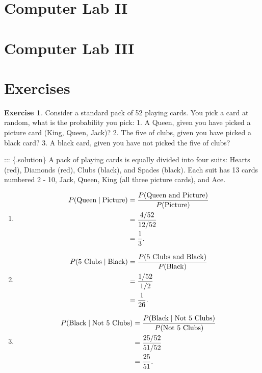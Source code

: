 \documentclass[
]{book}
\providecommand{\tightlist}{%
  \setlength{\itemsep}{0pt}\setlength{\parskip}{0pt}}
\theoremstyle{definition}
\theoremstyle{definition}
\theoremstyle{definition}
\newtheorem{exercise}{Exercise}[chapter]
\theoremstyle{definition}
\theoremstyle{remark}
\begin{document}
\hypertarget{computer-lab-ii}{%
\section{Computer Lab II}\label{computer-lab-ii}}

\hypertarget{computer-lab-iii}{%
\section{Computer Lab III}\label{computer-lab-iii}}

\hypertarget{exercises}{%
\section{Exercises}\label{exercises}}

\begin{exercise}
Consider a standard pack of 52 playing cards. You pick a card at random, what is the probability you pick:
1. A Queen, given you have picked a picture card (King, Queen, Jack)?
2. The five of clubs, given you have picked a black card?
3. A black card, given you have not picked the five of clubs?
\end{exercise}

::: \{.solution\}
A pack of playing cards is equally divided into four suits: Hearts (red), Diamonds (red), Clubs (black), and Spades (black). Each suit has 13 cards numbered 2 - 10, Jack, Queen, King (all three picture cards), and Ace.

\begin{enumerate}
\def\labelenumi{\arabic{enumi}.}
\tightlist
\item
  \begin{align*}
  P(\hbox{Queen} \mid \hbox{Picture}) &= \frac{P(\hbox{Queen and Picture})}{P(\hbox{Picture)}} \\
  & = \frac{4/52}{12/52} \\
  & = \frac{1}{3}.
  \end{align*}
\item
  \begin{align*}
  P(\hbox{5 Clubs} \mid \hbox{Black}) &= \frac{P(\hbox{5 Clubs and Black})}{P(\hbox{Black)}} \\
  & = \frac{1/52}{1/2} \\
  & = \frac{1}{26}.
  \end{align*}
\item
  \begin{align*}
  P(\hbox{Black} \mid \hbox{Not 5 Clubs}) & = \frac{P(\hbox{Black} \mid \hbox{Not 5 Clubs})}{P(\hbox{Not 5 Clubs})} \\
  & = \frac{25/52}{51/52}\\
  &= \frac{25}{51}.
  \end{align*}
\end{enumerate}
\end{document}
